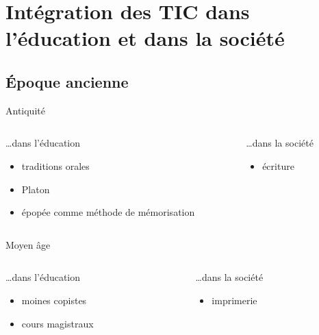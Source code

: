 
\section{Intégration des TIC dans l'éducation et dans la société}

\subsection{Époque ancienne}

\begin{frame}{Antiquité}
\begin{columns}
\begin{column}{0.49\linewidth}
\ldots dans l'éducation
\begin{itemize}
\item traditions orales
\item Platon
\item épopée comme méthode de mémorisation
\end{itemize}
\end{column}

\begin{column}{0.49\linewidth}
\ldots dans la société
\begin{itemize}
\item écriture
\end{itemize}
\end{column}
\end{columns}
\end{frame}

\begin{frame}{Moyen âge}
\begin{columns}
\begin{column}{0.49\linewidth}
\ldots dans l'éducation
\begin{itemize}
\item moines copistes
\item cours magistraux
\end{itemize}
\end{column}

\begin{column}{0.49\linewidth}
\ldots dans la société
\begin{itemize}
\item imprimerie
\end{itemize}
\end{column}
\end{columns}
\end{frame}

